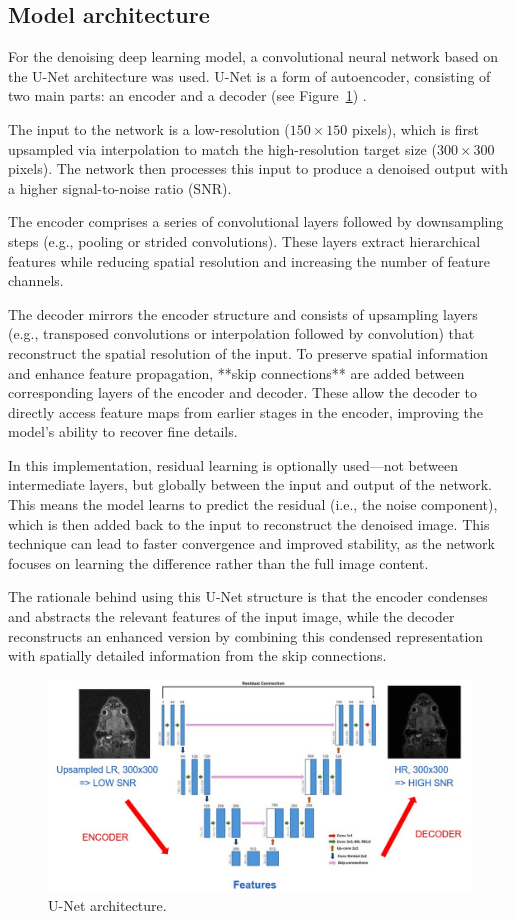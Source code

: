 \documentclass[twocolumn]{article}
\begin{document}
\subsection{Model architecture}
For the denoising deep learning model, a convolutional neural network based on the U-Net architecture was used. 
U-Net is a form of autoencoder, consisting of two main parts: an encoder and a decoder (see Figure~\ref{fig:U-Net}) \cite{ronneberger2015unet}.

The input to the network is a low-resolution ($150 \times 150$ pixels), which is first upsampled via interpolation to match the high-resolution target size ($300 \times 300$ pixels). 
The network then processes this input to produce a denoised output with a higher signal-to-noise ratio (SNR).

The encoder comprises a series of convolutional layers followed by downsampling steps (e.g., pooling or strided convolutions). 
These layers extract hierarchical features while reducing spatial resolution and increasing the number of feature channels.

The decoder mirrors the encoder structure and consists of upsampling layers (e.g., transposed convolutions or interpolation followed by convolution) that reconstruct the spatial resolution of the input. 
To preserve spatial information and enhance feature propagation, **skip connections** are added between corresponding layers of the encoder and decoder. 
These allow the decoder to directly access feature maps from earlier stages in the encoder, improving the model’s ability to recover fine details.

In this implementation, residual learning is optionally used—not between intermediate layers, but globally between the input and output of the network. 
This means the model learns to predict the residual (i.e., the noise component), which is then added back to the input to reconstruct the denoised image.
This technique can lead to faster convergence and improved stability, as the network focuses on learning the difference rather than the full image content.

The rationale behind using this U-Net structure is that the encoder condenses and abstracts the relevant features of the input image, while the decoder reconstructs an enhanced version by combining this condensed representation with spatially detailed information from the skip connections.

\begin{figure}
    \centering
    \includegraphics[width=0.8\linewidth]{U-Net.jpg}
    \caption{U-Net architecture.}
    \label{fig:U-Net}
\end{figure}
\end{document}
